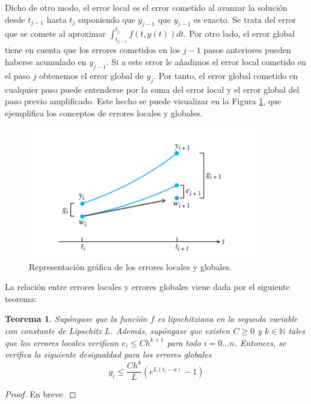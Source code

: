\documentclass{article}
\theoremstyle{theorem-style}  %
\newtheorem{theorem}{Teorema}[section]  %
\theoremstyle{definition-style}
\theoremstyle{example-style}
\begin{document}
	Dicho de otro modo, el error local es el error cometido al avanzar la solución desde $t_{j-1}$ hasta $t_j$ suponiendo que $y_{j-1}$ que $y_{j-1}$ es exacto. Se trata del error que se comete al aproximar $\int_{t_{j-1}}^{t_{j}} f(t,y(t)) dt$. 
	Por otro lado, el error global tiene en cuenta que los errores cometidos en los $j-1$ pasos anteriores pueden haberse acumulado en $y_{j-1}$. Si a este error le añadimos el error local cometido en el paso $j$ obtenemos el error global de $y_j$.
	Por tanto, el error global cometido en cualquier paso puede entenderse por la suma del error local y el error global del paso previo amplificado. Este hecho se puede visualizar en la Figura \ref{fig:error}, que ejemplifica los conceptos de errores locales y globales.
		
	\begin{figure}[h]
		\centering
		\includegraphics[width=10cm]{./Images/error-euler.png}
		\caption{Representación gráfica de los errores locales y globales.} 
		\label{fig:error}
	\end{figure}
	
	La relación entre errores locales y errores globales viene dada por el siguiente teorema: \\
	
	\begin{theorem} \label{theorem:local-global-error}
		Supóngase que la función $f$ es lipschitziana en la segunda variable con constante de Lipschitz $L$. Además, supóngase que existen $C \ge 0$ y $k \in \mathbb{N}$ tales que los errores locales verifican $e_i \le C h^{k+1}$ para todo $i = 0 \ldots n$. Entonces, se verifica la siguiente desigualdad para los errores globales
		\begin{equation}
			g_i \le \frac{C h^k}{L} (e^{L(t_i-a)}-1)
		\end{equation}
	\end{theorem} 
	\begin{proof}
		En breve.
	\end{proof}
	
\end{document}
